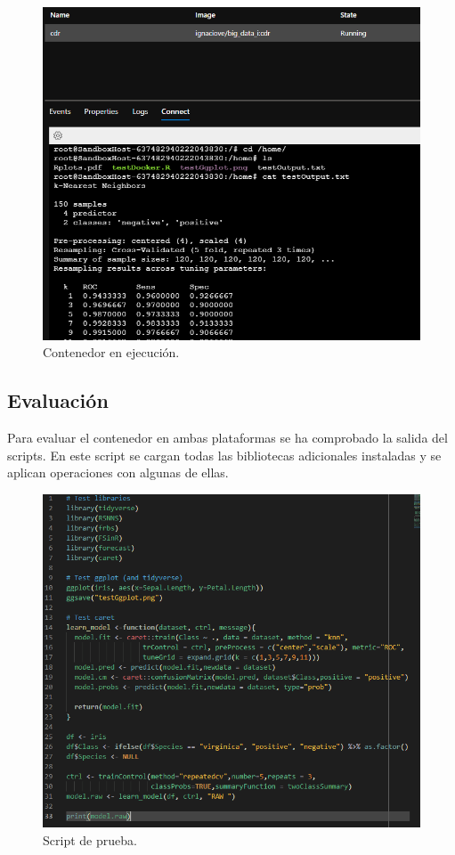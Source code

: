 \begin{figure}[H]\center\includegraphics[width=.95\linewidth]{img/r/r10.png}\caption{Contenedor en ejecución.}\end{figure}

\subsection{Evaluación}

Para evaluar el contenedor en ambas plataformas se ha comprobado la salida del scripts. En este script se cargan todas las bibliotecas adicionales instaladas y se aplican operaciones con algunas de ellas.

\begin{figure}[H]\center\includegraphics[width=.95\linewidth]{img/r/r9.png}\caption{Script de prueba.}\end{figure}